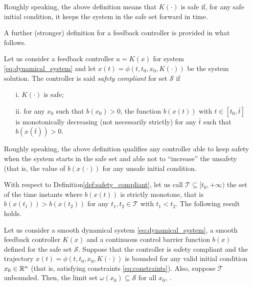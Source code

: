 Roughly speaking, the above definition means that $K(\cdot)$ is safe if, for any safe initial condition, it keeps the system in the safe set forward in time. 

A further (stronger) definition for a feedback controller is provided in what follows.


\begin{definitionNoPoint}\label{def:safety_compliant}
	Let us consider a feedback controller $u=K(x)$ for system  \eqref{eq:dynamical_system} and let $x(t)=\phi(t,t_0,x_0,K(\cdot))$ be the system solution. 
	The controller is said {\em safety compliant} for set $\mathcal{S}$ if
	\begin{itemize}
		\item [i.]  $K(\cdot)$ is safe;
		\item [ii.] for any $x_0$ such that $b(x_0)>0 $, the function $b(x(t))$ with $t\in [t_0, \bar{t}]$ is monotonically decreasing (not necessarily strictly) for any $\bar{t}$ such that $b(x(\bar{t}))>0$. 
	\end{itemize}
	
\end{definitionNoPoint}

Roughly speaking, the above definition qualifies any controller able to keep safety when the system starts in the safe set and able not to ``increase'' the unsafety (that is, the value of $b(x(\cdot))$ for any unsafe initial condition. 



With respect to Definition\tildeAdd\ref{def:safety_compliant}, let us call $\mathcal{T}\subseteq [t_0, +\infty) $ the set of the time instants where $b(x(t))$ is strictly monotone, that is $b(x(t_1))>b(x(t_2))$ for any $t_1,t_2\in \mathcal{T}$ with $t_1<t_2$.
The following result holds.

\begin{theorem} \label{thm:safety-compliant}
	Let us consider a smooth dynamical system  \eqref{eq:dynamical_system}, a smooth feedback controller $K(x)$ and a continuous control barrier function $b(x)$ defined for the safe set $\mathcal{S}$. 
	Suppose that the controller is safety compliant and the trajectory
	$x(t)=\phi(t,t_0,x_0,K(\cdot))$ is bounded for any valid initial condition $x_0\in\Bbb{R}^n$ (that is, satisfying constraints \eqref{eq:constraints}). Also, suppose  $\mathcal{T}$ unbounded.
	Then, the limit set  $\omega(x_0)\subseteq \mathcal{S}$ for all $x_0$, \cite{khalil}.
	
\end{theorem}



